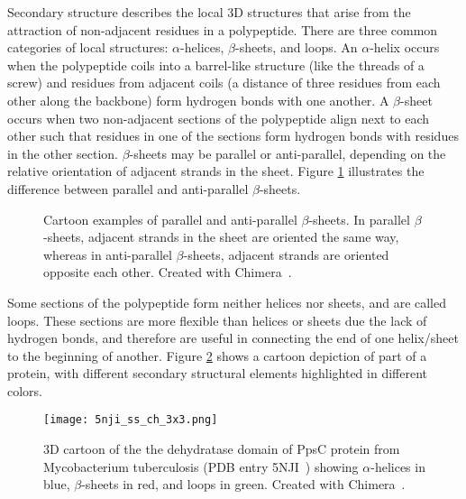 Secondary structure describes the local 3D structures that arise from the attraction of non-adjacent residues in a polypeptide.
There are three common categories of local structures: $\alpha$-helices, $\beta$-sheets, and loops.
An  $\alpha$-helix occurs when the polypeptide coils into a barrel-like structure (like the threads of a screw) and residues from adjacent coils (a distance of three residues from each other along the backbone) form hydrogen bonds with one another.
A $\beta$-sheet occurs when two non-adjacent sections of the polypeptide align next to each other such that residues in one of the sections form hydrogen bonds with residues in the other section.
$\beta$-sheets may be parallel or anti-parallel, depending on the relative orientation of adjacent strands in the sheet.
Figure \ref{fig:beta} illustrates the difference between parallel and anti-parallel $\beta$-sheets.
\begin{figure}
	\centering
	\hfill
	\caption{Cartoon examples of parallel and anti-parallel $\beta$-sheets. In parallel $\beta$-sheets, adjacent strands in the sheet are oriented the same way, whereas in anti-parallel $\beta$-sheets, adjacent strands are oriented opposite each other. Created with Chimera~\cite{pettersen2004}.}
	\label{fig:beta}
\end{figure}
Some sections of the polypeptide form neither helices nor sheets, and are called loops.
These sections are more flexible than helices or sheets due the lack of hydrogen bonds, and therefore are useful in connecting the end of one helix/sheet to the beginning of another.
Figure \ref{fig:5nji_ss} shows a cartoon depiction of part of a protein, with different secondary structural elements highlighted in different colors.
	
\begin{figure}
	\centering
	\texttt{[image: 5nji\_ss\_ch\_3x3.png]}
	\caption{3D cartoon of the the dehydratase domain of PpsC protein from Mycobacterium tuberculosis (PDB entry 5NJI~\cite{faille2017}) showing $\alpha$-helices in blue, $\beta$-sheets in red, and loops in green. Created with Chimera~\cite{pettersen2004}.}
	\label{fig:5nji_ss}
\end{figure}


